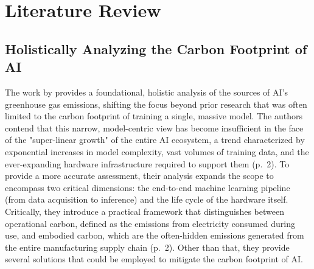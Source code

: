 \documentclass[a4paper, 12pt]{article}
\begin{document}
\section{Literature Review}
\subsection{Holistically Analyzing the Carbon Footprint of AI}
The work by \citet{Wu2022} provides a foundational, holistic analysis of the sources of AI's greenhouse gas emissions, shifting the focus beyond prior research that was often limited to the carbon footprint of training a single, massive model. The authors contend that this narrow, model-centric view has become insufficient in the face of the "super-linear growth" of the entire AI ecosystem, a trend characterized by exponential increases in model complexity, vast volumes of training data, and the ever-expanding hardware infrastructure required to support them (p.~2). To provide a more accurate assessment, their analysis expands the scope to encompass two critical dimensions: the end-to-end machine learning pipeline (from data acquisition to inference) and the life cycle of the hardware itself. Critically, they introduce a practical framework that distinguishes between operational carbon, defined as the emissions from electricity consumed during use, and embodied carbon, which are the often-hidden emissions generated from the entire manufacturing supply chain (p.~2). Other than that, they provide several solutions that could be employed to mitigate the carbon footprint of AI.
\end{document}
